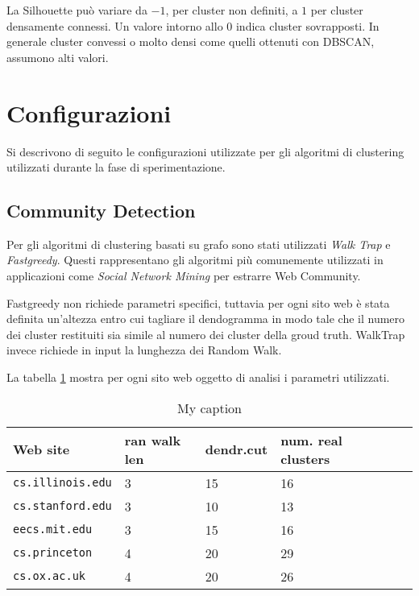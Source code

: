 La Silhouette può variare da $-1$, per cluster non definiti, a $1$ per cluster densamente connessi. Un valore intorno allo $0$ indica cluster sovrapposti. In generale cluster convessi o molto densi come quelli ottenuti con DBSCAN, assumono alti valori.
\section{Configurazioni}
Si descrivono di seguito le configurazioni utilizzate per gli algoritmi di clustering utilizzati durante la fase di sperimentazione. 

\subsection{Community Detection}
Per gli algoritmi di clustering basati su grafo sono stati utilizzati \textit{Walk Trap} e \textit{Fastgreedy}. Questi rappresentano gli algoritmi più comunemente utilizzati in applicazioni come \textit{Social Network Mining} per estrarre Web Community.

Fastgreedy non richiede parametri specifici, tuttavia per ogni sito web è stata definita un'altezza entro cui tagliare il dendogramma in modo tale che il numero dei cluster restituiti sia simile al numero dei cluster della groud truth. WalkTrap invece richiede in input la lunghezza dei Random Walk.



La tabella \ref{tabwebsites} mostra per ogni sito web oggetto di analisi i parametri utilizzati.

\begin{table}[]
\centering
\caption{My caption}
\label{tabwebsites}
\begin{tabular}{|l|l|l|l|l|l|}
\hline
 \textbf{Web site}& \textbf{ran walk len} & \textbf{dendr.cut} & \textbf{num. real clusters}\\ \hline
\texttt{cs.illinois.edu}  & 3 &   15 & 16 \\ \hline
\texttt{cs.stanford.edu}& 3 & 10 & 13 \\ \hline
\texttt{eecs.mit.edu} & 3 & 15 & 16 \\ \hline
\texttt{cs.princeton} & 4 & 20 & 29 \\ \hline
\texttt{cs.ox.ac.uk} & 4 & 20 & 26 \\ \hline
\end{tabular}
\end{table}

